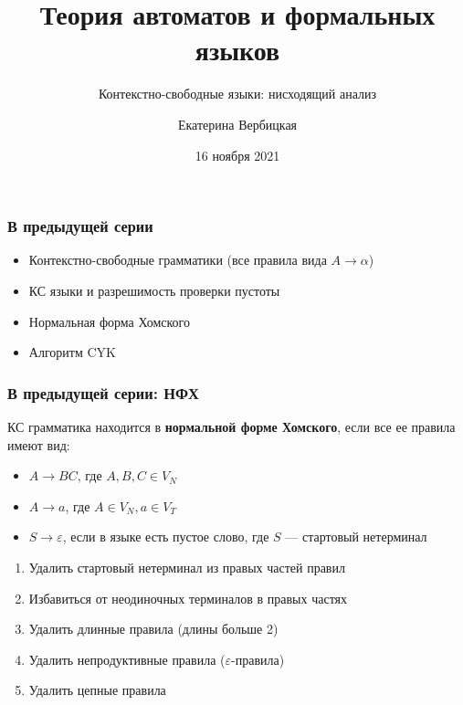 \documentclass{beamer}
\title[]{Теория автоматов и формальных языков}
\subtitle[]{Контекстно-свободные языки: нисходящий анализ}
\institute[]{
Санкт-Петербургский государственный электротехнический университет <<ЛЭТИ>>\\
}
\author[]{Екатерина Вербицкая}
\date{16 ноября 2021}
\begin{document}
{
  \begin{frame}
    \titlepage
  \end{frame}
}


\begin{frame}[fragile]
  \transwipe[direction=90]
  \frametitle{В предыдущей серии}
  \begin{itemize}
    \item Контекстно-свободные грамматики (все правила вида $A \to \alpha$)
    \item КС языки и разрешимость проверки пустоты
    \item Нормальная форма Хомского
    \item Алгоритм CYK
  \end{itemize}
\end{frame}

\begin{frame}[fragile]
  \transwipe[direction=90]
  \frametitle{В предыдущей серии: НФХ}
  КС грамматика находится в \textbf{нормальной форме Хомского}, если все ее правила имеют вид:
  \begin{itemize}
    \item $A \to B C$, где $A,B,C \in V_N$
    \item $A \to a$, где $A \in V_N, a \in V_T$
    \item $S \to \varepsilon$, если в языке есть пустое слово, где $S$ --- стартовый нетерминал
  \end{itemize}

  \begin{enumerate}
    \item Удалить стартовый нетерминал из правых частей правил
    \item Избавиться от неодиночных терминалов в правых частях
    \item Удалить длинные правила (длины больше 2)
    \item Удалить непродуктивные правила ($\varepsilon$-правила)
    \item Удалить цепные правила
   \end{enumerate}
\end{frame}
\end{document}
